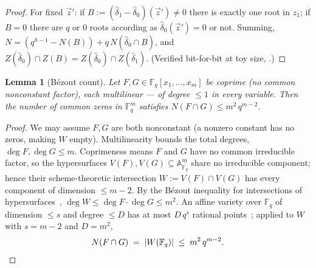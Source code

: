 \documentclass{article}
\newcommand{\Fq}{\mathbb{F}_q}
\newtheorem{lemma}[theorem]{Lemma}
\theoremstyle{definition}
\begin{document}
\begin{proof}
For fixed $\vec z'$: if $B := (\hat\delta_1 - \hat\delta_0)(\vec z') \neq 0$ there is exactly one root in $z_1$; if $B = 0$ there are $q$ or $0$ roots according as $\hat\delta_0(\vec z') = 0$ or not. Summing, $N = (q^{h-1} - N(B)) + q\,N(\hat\delta_0 \cap B)$, and $Z(\hat\delta_0) \cap Z(B) = Z(\hat\delta_0) \cap Z(\hat\delta_1)$. (Verified bit-for-bit at toy size, .)
\end{proof}

\begin{lemma}[B\'ezout count]\label{lem:bezout}
Let $F, G \in \Fq[x_1, \dots, x_m]$ be coprime (no common nonconstant factor), each multilinear --- of degree $\leq 1$ in every variable. Then the number of common zeros in $\Fq^m$ satisfies $N(F \cap G) \leq m^2\, q^{m-2}$.
\end{lemma}

\begin{proof}
We may assume $F, G$ are both nonconstant (a nonzero constant has no zeros, making $W$ empty). Multilinearity bounds the total degrees, $\deg F, \deg G \leq m$. Coprimeness means $F$ and $G$ have no common irreducible factor, so the hypersurfaces $V(F), V(G) \subseteq \mathbb{A}^m_{\overline{\Fq}}$ share no irreducible component; hence their scheme-theoretic intersection $W := V(F) \cap V(G)$ has every component of dimension $\leq m - 2$. By the B\'ezout inequality for intersections of hypersurfaces~\cite{heintz}, $\deg W \leq \deg F \cdot \deg G \leq m^2$. An affine variety over $\Fq$ of dimension $\leq s$ and degree $\leq D$ has at most $D\, q^{s}$ rational points~\cite{lachaud_rolland}; applied to $W$ with $s = m - 2$ and $D = m^2$,
\[
N(F \cap G) \;=\; |W(\Fq)| \;\leq\; m^2\, q^{m-2}. \qedhere
\]
\end{proof}
\end{document}

